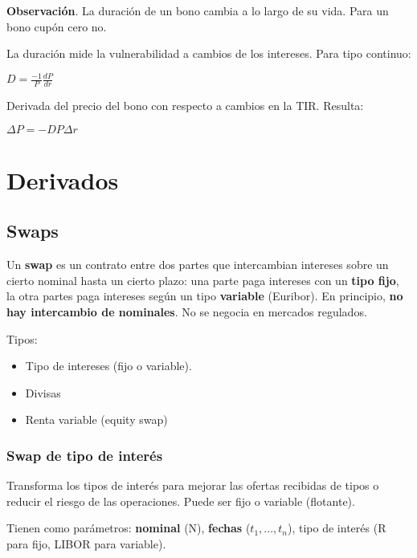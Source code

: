 \documentclass[
10pt, %
a4paper, %
oneside, %
headinclude,footinclude, %
BCOR5mm, %
]{scrartcl}
\newcommand{\n}[1]{\textbf{#1}}
\newcommand{\sub}[1]{_{#1}}
\newcommand{\f}[1]{{\large{${#1}$}}}
\newcounter{ex}
\begin{document}
			\n{Observación}. La duración de un bono cambia a lo largo de su vida. Para un bono cupón cero no.

			La duración mide la vulnerabilidad a cambios de los intereses. Para tipo continuo:
			\begin{center} \f{D = \frac{-1}{P} \frac{dP}{dr}} \end{center}

				
				Derivada del precio del bono con respecto a cambios en la TIR. Resulta: \begin{center} \f{\Delta P = -DP\Delta r} \end{center}


	\newpage

\section{Derivados}

	\subsection{Swaps}

		Un \n{swap} es un contrato entre dos partes que intercambian intereses sobre un cierto nominal hasta un cierto plazo: una parte paga intereses con un \n{tipo fijo}, la otra partes paga intereses según un tipo \n{variable} (Euribor). En principio, \n{no hay intercambio de nominales}.
		No se negocia en mercados regulados.

		Tipos:
		\begin{itemize}
			\item Tipo de intereses (fijo o variable).
			\item Divisas
			\item Renta variable (equity swap)
		\end{itemize}

		\subsubsection{Swap de tipo de interés}

			Transforma los tipos de interés para mejorar las ofertas recibidas de tipos o reducir el riesgo de las operaciones. Puede ser fijo o variable (flotante).

			Tienen como parámetros: \n{nominal} (N), \n{fechas} (\f{t\sub{1},...,t\sub{n}}), tipo de interés (R para fijo, LIBOR para variable).
\end{document}
